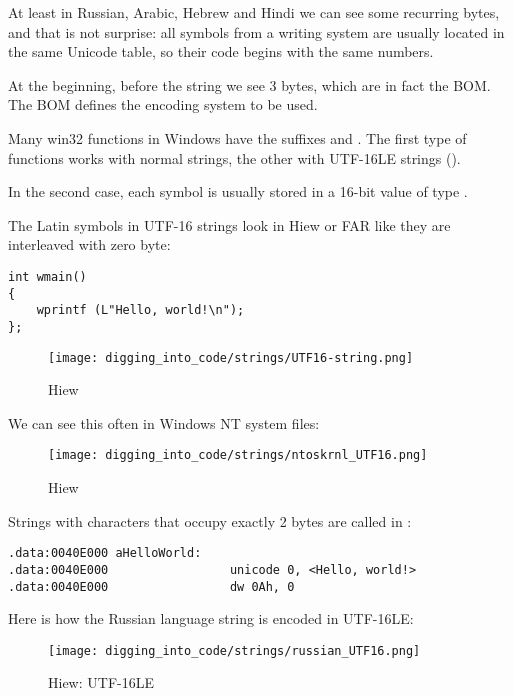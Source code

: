 At least in Russian, Arabic, Hebrew and Hindi we can see some recurring bytes, and that is not surprise:
all symbols from a writing system are usually located in the same Unicode table, so their code begins with
the same numbers.

At the beginning, before the  string we see 3 bytes, which are in fact the \ac{BOM}.
The \ac{BOM} defines the encoding system to be
used.


Many win32 functions in Windows have the suffixes  and .
The first type of functions works
with normal strings, the other with UTF-16LE strings ().

In the second case, each symbol is usually stored in a 16-bit value of type .

The Latin symbols in UTF-16 strings look in Hiew or FAR like they are interleaved with zero byte:

\begin{lstlisting}[style=customc]
int wmain()
{
	wprintf (L"Hello, world!\n");
};
\end{lstlisting}

\begin{figure}[H]
\centering
\texttt{[image: digging\_into\_code/strings/UTF16-string.png]}
\caption{Hiew}
\end{figure}

We can see this often in \gls{Windows NT} system files:

\begin{figure}[H]
\centering
\texttt{[image: digging\_into\_code/strings/ntoskrnl\_UTF16.png]}
\caption{Hiew}
\end{figure}

Strings with characters that occupy exactly 2 bytes are called  in \IDA:

\begin{lstlisting}[style=customasm]
.data:0040E000 aHelloWorld:
.data:0040E000                 unicode 0, <Hello, world!>
.data:0040E000                 dw 0Ah, 0
\end{lstlisting}

Here is how the Russian language string is encoded in UTF-16LE:

\begin{figure}[H]
\centering
\texttt{[image: digging\_into\_code/strings/russian\_UTF16.png]}
\caption{Hiew: UTF-16LE}
\end{figure}

